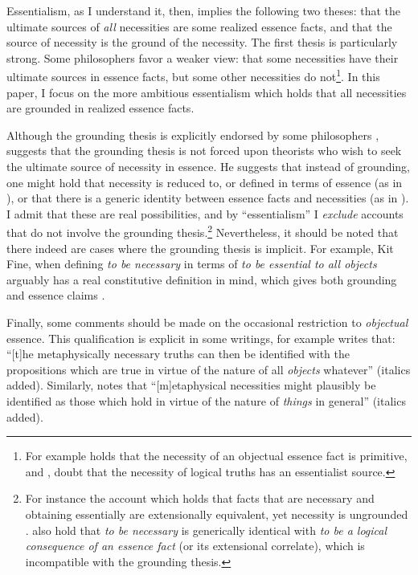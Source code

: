 \documentclass[12pt]{article}
\begin{document}
\par
Essentialism, as I understand it, then, implies the following two theses: that the ultimate sources of \textit{all} necessities are some realized essence facts, and that the source of necessity is the ground of the necessity. The first thesis is particularly strong. Some philosophers favor a weaker view: that some necessities have their ultimate sources in essence facts, but some other necessities do not\footnote{For example \citet[Ch.6]{Hale2013-HALNBA} holds that the necessity of an objectual essence fact is primitive, and \citet{Godman2020-MALEPA-3}, \citet{Correia2021-COREMA-3} doubt that the necessity of logical truths has an essentialist source.}. In this paper, I focus on the more ambitious essentialism which holds that all necessities are grounded in realized essence facts. 
\par
Although the grounding thesis is explicitly endorsed by some philosophers \citep[e.g.,][]{Lowe2012-LOWWIT-2, Hale2013-HALNBA, Wallner2020-WALEEA-6}, \citet{correia2024non} suggests that the grounding thesis is not forced upon theorists who wish to seek the ultimate source of necessity in essence. He suggests that instead of grounding, one might hold that necessity is reduced to, or defined in terms of essence (as in \citet{Fine1994-FINEAM-2,Fine1995-FINTLO}), or that there is a generic identity between essence facts and necessities (as in \citet{Correia2021-COREMA-3}). I admit that these are real possibilities, and by ``essentialism'' I \textit{exclude} accounts that do not involve the grounding thesis.\footnote{
    For instance the account which holds that facts that are necessary and obtaining essentially are extensionally equivalent, yet necessity is ungrounded \citep{Wilsch2017-WILSMP-3}. \citet{Correia2021-COREMA-3} also hold that \textit{to be necessary} is generically identical with \textit{to be a logical consequence of an essence fact} (or its extensional correlate), which is incompatible with the grounding thesis.
} Nevertheless, it should be noted that there indeed are cases where the grounding thesis is implicit. For example, Kit Fine, when defining \textit{to be necessary} in terms of \textit{to be essential to all objects} arguably has a real constitutive definition in mind, which gives both grounding and essence claims \citep{Fine2015-FINUFF}. 
\par
Finally, some comments should be made on the occasional restriction to \textit{objectual} essence. This qualification is explicit in some writings, for example \citet[9]{Fine1994-FINEAM-2} writes that: ``[t]he metaphysically necessary truths can then be identified with the propositions which are true in virtue of the nature of all \textit{objects} whatever'' (italics added). Similarly, \citet[150]{Hale2013-HALNBA} notes that ``[m]etaphysical necessities might plausibly be identified as those which hold in virtue of the nature of \textit{things} in general'' (italics added). 
\end{document}
